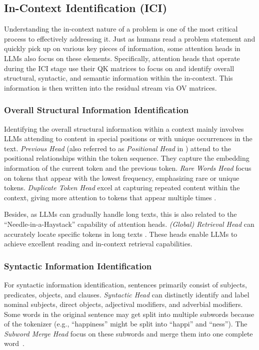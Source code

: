 \documentclass{article}
\begin{document}
\subsection{In-Context Identification (ICI)} \label{subsec:ICI}
Understanding the in-context nature of a problem is one of the most critical process to effectively addressing it. Just as humans read a problem statement and quickly pick up on various key pieces of information, some attention heads in LLMs also focus on these elements. Specifically, attention heads that operate during the ICI stage use their QK matrices to focus on and identify overall structural, syntactic, and semantic information within the in-context. This information is then written into the residual stream via OV matrices.

\subsubsection{Overall Structural Information Identification} \label{sucsubsec:overallstructure}
Identifying the overall structural information within a context mainly involves LLMs attending to content in special positions or with unique occurrences in the text.
\textit{Previous Head} \citep{InductionHeads_22_TCT_Anthropic} (also referred to as \textit{Positional Head} in \citep{InformationFlow_24_arXiv_Meta}) attend to the positional relationships within the token sequence. They capture the embedding information of the current token and the previous token.
\textit{Rare Words Head} \citep{SpecialHead_19_ACL_Russia} focus on tokens that appear with the lowest frequency, emphasizing rare or unique tokens.
\textit{Duplicate Token Head} excel at capturing repeated content within the context, giving more attention to tokens that appear multiple times \citep{IOI_23_ICLR_Redwood}.

Besides, as LLMs can gradually handle long texts, this is also related to the ``Needle-in-a-Haystack'' capability of attention heads. \textit{(Global) Retrieval Head} can accurately locate specific tokens in long texts \citep{RetrievalHead_24_arXiv_PKU, GlobalAttention_24_arXiv_THU, RetrievalHead_24_arXiv_Huawei}. These heads enable LLMs to achieve excellent reading and in-context retrieval capabilities.

\subsubsection{Syntactic Information Identification} \label{subsubsec:syntactic}
For syntactic information identification, sentences primarily consist of subjects, predicates, objects, and clauses. \textit{Syntactic Head} can distinctly identify and label nominal subjects, direct objects, adjectival modifiers, and adverbial modifiers.
Some words in the original sentence may get split into multiple subwords because of the tokenizer (e.g., ``happiness'' might be split into ``happi'' and ``ness''). The \textit{Subword Merge Head} focus on these subwords and merge them into one complete word~\citep{InformationFlow_24_arXiv_Meta}.
\end{document}
